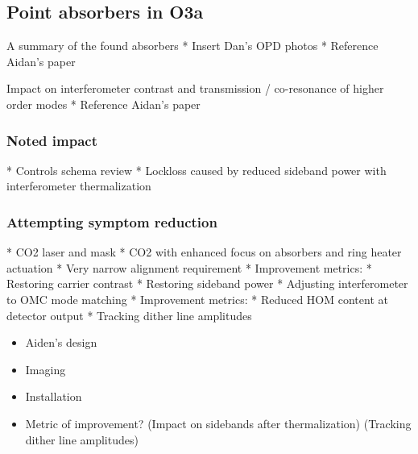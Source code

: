 
\subsection{Point absorbers in O3a}
A summary of the found absorbers 
	* Insert Dan's OPD photos 
	* Reference Aidan's paper

Impact on interferometer contrast and transmission / co-resonance of higher order modes 
	* Reference Aidan's paper

\subsubsection{Noted impact}
	* Controls schema review
	* Lockloss caused by reduced sideband power with interferometer thermalization

\subsubsection{Attempting symptom reduction}
	* CO2 laser and mask
		* CO2 with enhanced focus on absorbers and ring heater actuation
		* Very narrow alignment requirement
		* Improvement metrics:
			* Restoring carrier contrast
			* Restoring sideband power	
	* Adjusting interferometer to OMC mode matching
		* Improvement metrics:
			* Reduced HOM content at detector output
			* Tracking dither line amplitudes

\begin{itemize}
\item Aiden's design
\item Imaging
\item Installation

\item Metric of improvement? (Impact on sidebands after thermalization) (Tracking dither line amplitudes)
\end{itemize}

